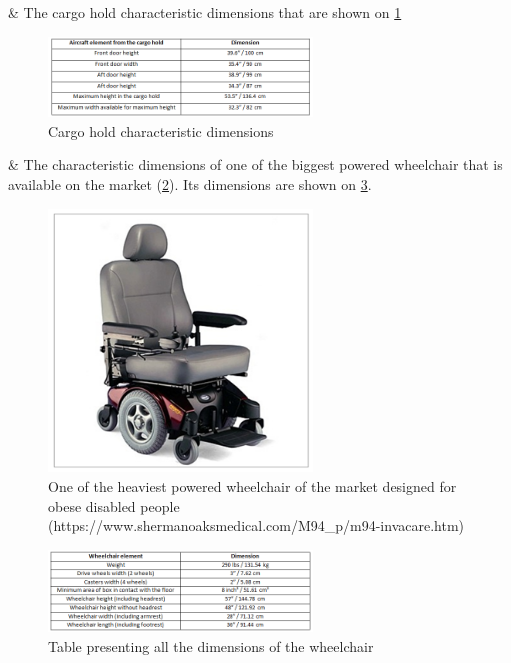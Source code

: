 \begin{easylist}[itemize]

& The cargo hold characteristic dimensions that are shown on \ref{fig:cargo_hold_geometry_table} 

\begin{figure}[h]
\centering
\includegraphics[width=7cm]{images/cargo_hold_geometry_table.png}
\caption{Cargo hold characteristic dimensions}
\label{fig:cargo_hold_geometry_table}
\end{figure}

& The characteristic dimensions of one of the biggest powered wheelchair that is available on the market (\ref{fig:heavy_wheelchair}). Its dimensions are shown on \ref{fig:wheelchair_geometry_table}.

\begin{figure}[h]
\centering
\includegraphics[width=7cm]{images/heavy_wheelchair.png}
\caption{One of the heaviest powered wheelchair of the market designed for obese disabled people (https://www.shermanoaksmedical.com/M94\_p/m94-invacare.htm)}
\label{fig:heavy_wheelchair}
\end{figure}

\begin{figure}[h]
\centering
\includegraphics[width=7cm]{images/wheelchair_geometry_table.png}
\caption{Table presenting all the dimensions of the wheelchair}
\label{fig:wheelchair_geometry_table}
\end{figure}

\end{easylist}

